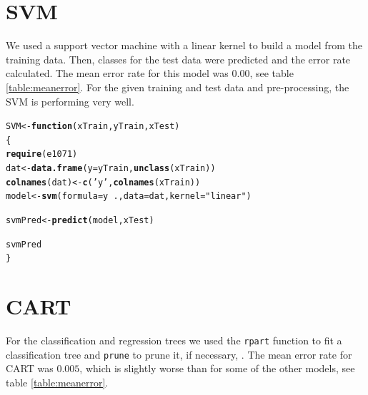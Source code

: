 \documentclass[a4paper,draft=false]{scrreprt}\usepackage[]{graphicx}\usepackage[]{color}
\makeatletter
\newcommand{\hlstr}[1]{\textcolor[rgb]{0.192,0.494,0.8}{#1}}%
\newcommand{\hlopt}[1]{\textcolor[rgb]{0,0,0}{#1}}%
\newcommand{\hlstd}[1]{\textcolor[rgb]{0.345,0.345,0.345}{#1}}%
\newcommand{\hlkwa}[1]{\textcolor[rgb]{0.161,0.373,0.58}{\textbf{#1}}}%
\newcommand{\hlkwb}[1]{\textcolor[rgb]{0.69,0.353,0.396}{#1}}%
\newcommand{\hlkwc}[1]{\textcolor[rgb]{0.333,0.667,0.333}{#1}}%
\newcommand{\hlkwd}[1]{\textcolor[rgb]{0.737,0.353,0.396}{\textbf{#1}}}%
\newenvironment{kframe}{%
 \def\at@end@of@kframe{}%
 \ifinner\ifhmode%
  \def\at@end@of@kframe{\end{minipage}}%
  \begin{minipage}{\columnwidth}%
 \fi\fi%
 \def\FrameCommand##1{\hskip\@totalleftmargin \hskip-\fboxsep
 \colorbox{shadecolor}{##1}\hskip-\fboxsep
     \hskip-\linewidth \hskip-\@totalleftmargin \hskip\columnwidth}%
 \MakeFramed {\advance\hsize-\width
   \@totalleftmargin\z@ \linewidth\hsize
   \@setminipage}}%
 {\par\unskip\endMakeFramed%
 \at@end@of@kframe}
\newenvironment{knitrout}{}{} %
\makeatother
\begin{document}
\section{SVM} %
We used a support vector machine \cite{e1071} with a linear kernel to build a model from the training data. Then, classes for the test data were predicted and the error rate calculated. The mean error rate for this model was $0.00$, see table \ref{table:meanerror}. For the given training and test data and pre-processing, the SVM is performing very well.
\begin{knitrout}
\color{fgcolor}\begin{kframe}
\begin{alltt}
\hlstd{SVM} \hlkwb{<-} \hlkwa{function}\hlstd{(}\hlkwc{xTrain}\hlstd{,} \hlkwc{yTrain}\hlstd{,} \hlkwc{xTest}\hlstd{)}
\hlstd{\{}
  \hlkwd{require}\hlstd{(e1071)}
  \hlstd{dat} \hlkwb{<-} \hlkwd{data.frame}\hlstd{(}\hlkwc{y} \hlstd{= yTrain,} \hlkwd{unclass}\hlstd{(xTrain))}
  \hlkwd{colnames}\hlstd{(dat)} \hlkwb{<-} \hlkwd{c}\hlstd{(}\hlstr{'y'}\hlstd{,} \hlkwd{colnames}\hlstd{(xTrain))}
  \hlstd{model} \hlkwb{<-} \hlkwd{svm}\hlstd{(}\hlkwc{formula} \hlstd{= y} \hlopt{~} \hlstd{.,} \hlkwc{data} \hlstd{= dat,} \hlkwc{kernel} \hlstd{=} \hlstr{"linear"}\hlstd{)}

  \hlstd{svmPred} \hlkwb{<-} \hlkwd{predict}\hlstd{(model, xTest)}

  \hlstd{svmPred}
\hlstd{\}}
\end{alltt}
\end{kframe}
\end{knitrout}

\section{CART} %
For the classification and regression trees we used the \verb+rpart+ function to fit a classification tree and \verb+prune+ to prune it, if necessary, \cite{rpart}. The mean error rate for CART was $0.005$, which is slightly worse than for some of the other models, see table \ref{table:meanerror}.
\end{document}
